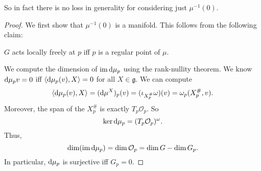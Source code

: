 \documentclass[a4paper]{article}
\begin{document}
So in fact there is no loss in generality for considering just $\mu^{-1}(0)$.
\begin{proof}
  We first show that $\mu^{-1}(0)$ is a manifold. This follows from the following claim:
  \begin{claim}
    $G$ acts locally freely at $p$ iff $p$ is a regular point of $\mu$.
  \end{claim}
  We compute the dimension of $\operatorname{im} \mathrm{d} \mu_p$ using the rank-nullity theorem. We know $\mathrm{d} \mu_p v = 0$ iff $\langle \mathrm{d} \mu_p(v), X\rangle = 0$ for all $X \in \mathfrak{g}$. We can compute
  \[
    \langle \mathrm{d} \mu_p(v), X\rangle = (\mathrm{d} \mu^X)_p (v) = (\iota_{X_p^\#} \omega) (v) = \omega_p(X_p^\#, v).
  \]
  Moreover, the span of the $X^\#_p$ is exactly $T_p \mathcal{O}_p$. So
  \[
    \ker \mathrm{d} \mu_p = (T_p \mathcal{O}_p)^\omega.
  \]
  Thus,
  \[
    \dim (\operatorname{im} \mathrm{d} \mu_p) = \dim \mathcal{O}_p = \dim G - \dim G_p.
  \]
  In particular, $\mathrm{d} \mu_p$ is surjective iff $G_p = 0$.


\end{proof}
\end{document}
